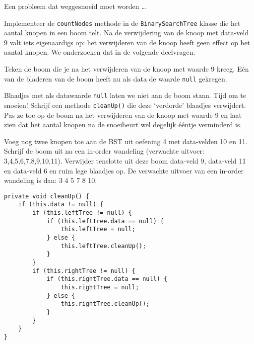 \begin{oef}
\begin{opl}
\end{opl}
\end{oef}




\begin{oef}
\papier \code Een probleem dat weggesnoeid moet worden …
\begin{oefenumerate}
\item Implementeer de \verb=countNodes= methode in de \verb=BinarySearchTree= klasse die het aantal knopen in een boom telt. Na de verwijdering van de knoop met data-veld 9 valt iets eigenaardigs op: het verwijderen van de knoop heeft geen effect op het aantal knopen. We onderzoeken dat in de volgende deelvragen.
	\item Teken  de boom die je na het verwijderen van de knoop met waarde 9 kreeg. Eén van de bladeren van de boom heeft nu als data de waarde \verb+null+ gekregen.
	\item Blaadjes met als datawaarde \verb+null+ laten we niet aan de boom staan. Tijd om te snoeien! Schrijf een methode \verb+cleanUp()+ die deze ‘verdorde’ blaadjes verwijdert. Pas ze toe op de boom na het verwijderen van de knoop met waarde 9 en laat zien dat het aantal knopen na de snoeibeurt wel degelijk ééntje verminderd is.  
	\item Voeg nog twee knopen toe aan de BST uit oefening 4 met data-velden 10 en 11. Schrijf de boom uit na een in-order wandeling (verwachte uitvoer: 3,4,5,6,7,8,9,10,11). Verwijder tenslotte uit deze boom data-veld 9, data-veld 11 en data-veld 6 en ruim lege blaadjes op. De verwachte uitvoer van een in-order wandeling is dan: 3 4 5 7 8 10.
\end{oefenumerate}
\begin{opl}
\begin{lstlisting}[caption={ruimOp methode}, label=bstruimop]
private void cleanUp() {
	if (this.data != null) {
		if (this.leftTree != null) {
			if (this.leftTree.data == null) {
				this.leftTree = null;
			} else {
				this.leftTree.cleanUp();
			}
		}
		if (this.rightTree != null) {
			if (this.rightTree.data == null) {
				this.rightTree = null;
			} else {
				this.rightTree.cleanUp();
			}
		}
	}
}
\end{lstlisting}
\end{opl}

\end{oef}


